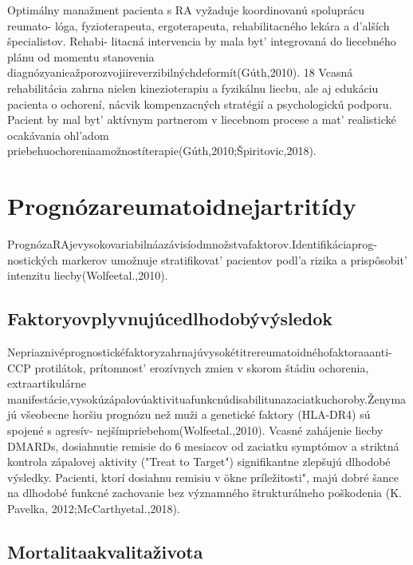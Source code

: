 Optimálny manažment pacienta s RA vyžaduje koordinovanú spoluprácu reumato- lóga, fyzioterapeuta, ergoterapeuta, rehabilitacného lekára a d’alších špecialistov. Rehabi- litacná intervencia by mala byt’ integrovaná do liecebného plánu od momentu stanovenia diagnózyanieažporozvojiireverzibilnýchdeformít(Gúth,2010). 18 Vcasná rehabilitácia zahrna nielen kinezioterapiu a fyzikálnu liecbu, ale aj edukáciu pacienta o ochorení, nácvik kompenzacných stratégií a psychologickú podporu. Pacient by mal byt’ aktívnym partnerom v liecebnom procese a mat’ realistické ocakávania ohl’adom priebehuochoreniaamožnostíterapie(Gúth,2010;Špiritovic,2018).


\section{Prognózareumatoidnejartritídy}

PrognózaRAjevysokovariabilnáazávisíodmnožstvafaktorov.Identifikáciaprog- nostických markerov umožnuje stratifikovat’ pacientov podl’a rizika a prispôsobit’ intenzitu liecby(Wolfeetal.,2010).


\subsection{Faktoryovplyvnujúcedlhodobývýsledok}

Nepriaznivéprognostickéfaktoryzahrnajúvysokétitrereumatoidnéhofaktoraaanti- CCP protilátok, prítomnost’ erozívnych zmien v skorom štádiu ochorenia, extraartikulárne manifestácie,vysokúzápalovúaktivituafunkcnúdisabilitunazaciatkuchoroby.Ženymajú všeobecne horšiu prognózu než muži a genetické faktory (HLA-DR4) sú spojené s agresív- nejšímpriebehom(Wolfeetal.,2010). Vcasné zahájenie liecby DMARDs, dosiahnutie remisie do 6 mesiacov od zaciatku symptómov a striktná kontrola zápalovej aktivity ("Treat to Target") signifikantne zlepšujú dlhodobé výsledky. Pacienti, ktorí dosiahnu remisiu v ökne príležitosti", majú dobré šance na dlhodobé funkcné zachovanie bez významného štrukturálneho poškodenia (K. Pavelka, 2012;McCarthyetal.,2018).


\subsection{Mortalitaakvalitaživota}

